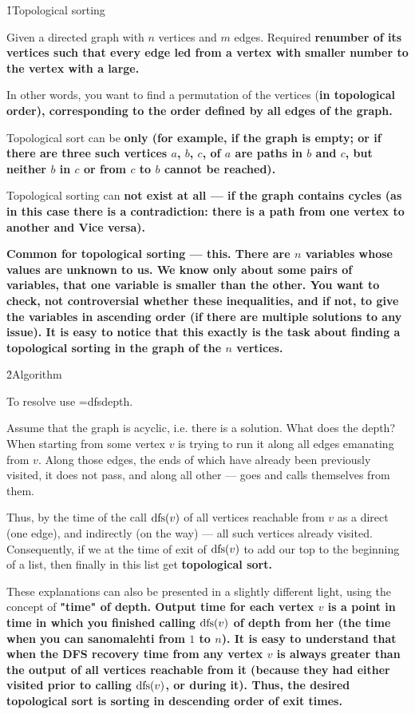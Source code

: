\h1{Topological sorting}

Given a directed graph with $n$ vertices and $m$ edges. Required \bf{renumber} of its vertices such that every edge led from a vertex with smaller number to the vertex with a large.

In other words, you want to find a permutation of the vertices (\bf{in topological order}), corresponding to the order defined by all edges of the graph.

Topological sort can be \bf{only} (for example, if the graph is empty; or if there are three such vertices $a$, $b$, $c$, of $a$ are paths in $b$ and $c$, but neither $b$ in $c$ or from $c$ to $b$ cannot be reached).

Topological sorting can \bf{not exist} at all --- if the graph contains cycles (as in this case there is a contradiction: there is a path from one vertex to another and Vice versa).

\bf{Common} for topological sorting --- this. There are $n$ variables whose values are unknown to us. We know only about some pairs of variables, that one variable is smaller than the other. You want to check, not controversial whether these inequalities, and if not, to give the variables in ascending order (if there are multiple solutions to any issue). It is easy to notice that this exactly is the task about finding a topological sorting in the graph of the $n$ vertices.


\h2{Algorithm}

To resolve use \algohref=dfs{depth}.

Assume that the graph is acyclic, i.e. there is a solution. What does the depth? When starting from some vertex $v$ is trying to run it along all edges emanating from $v$. Along those edges, the ends of which have already been previously visited, it does not pass, and along all other --- goes and calls themselves from them.

Thus, by the time of the call ${\rm dfs}(v)$ of all vertices reachable from $v$ as a direct (one edge), and indirectly (on the way) --- all such vertices already visited. Consequently, if we at the time of exit of ${\rm dfs}(v)$ to add our top to the beginning of a list, then finally in this list get \bf{topological sort}.

These explanations can also be presented in a slightly different light, using the concept of \bf{"time"} of depth. Output time for each vertex $v$ is a point in time in which you finished calling ${\rm dfs}(v)$ of depth from her (the time when you can sanomalehti from $1$ to $n$). It is easy to understand that when the DFS recovery time from any vertex $v$ is always greater than the output of all vertices reachable from it (because they had either visited prior to calling ${\rm dfs}(v)$, or during it). Thus, the desired topological sort is sorting in descending order of exit times.


